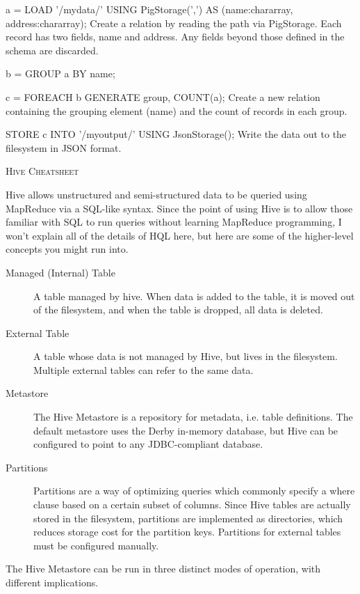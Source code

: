 \documentclass[10pt,letterpaper,twoside]{letter}
\begin{document}
\begin {description} [style=nextline]
\item[a = LOAD '/mydata/' USING PigStorage(',') AS (name:chararray, address:chararray);] Create a relation by reading the path via PigStorage.  Each record has two fields, name and address.  Any fields beyond those defined in the schema are discarded.
\item[b = GROUP a BY name;]
\item[c = FOREACH b GENERATE group, COUNT(a);]  Create a new relation containing the grouping element (name) and the count of records in each group.
\item[STORE c INTO '/myoutput/' USING JsonStorage();] Write the data out to the filesystem in JSON format.
\end {description}
\pagebreak
\begin{center}
\textsc{\large Hive Cheatsheet}
\end{center}
Hive allows unstructured and semi-structured data to be queried using MapReduce via a SQL-like syntax.  Since the point of using Hive is to allow those familiar with SQL to run queries without learning MapReduce programming, I won't explain all of the details of HQL here, but here are some of the higher-level concepts you might run into.
\begin{description} 
\item[Managed (Internal) Table] A table managed by hive.  When data is added to the table, it is moved out of the filesystem, and when the table is dropped, all data is deleted.
\item[External Table] A table whose data is not managed by Hive, but lives in the filesystem.  Multiple external tables can refer to the same data.
\item[Metastore] The Hive Metastore is a repository for metadata, i.e. table definitions.  The default metastore uses the Derby in-memory database, but Hive can be configured to point to any JDBC-compliant database.
\item[Partitions] Partitions are a way of optimizing queries which commonly specify a where clause based on a certain subset of columns.  Since Hive tables are actually stored in the filesystem, partitions are implemented as directories, which reduces storage cost for the partition keys.  Partitions for external tables must be configured manually.
\end{description}
The Hive Metastore can be run in three distinct modes of operation, with different implications.
\end{document}
